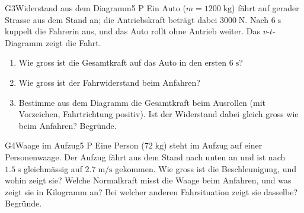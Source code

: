 \documentclass[11pt]{article}
\begin{document}
\begin{lpaufgabe}{G3}{Widerstand aus dem Diagramm}{5 P}
Ein Auto ($m = 1200\;\text{kg}$) fährt auf gerader Strasse aus dem Stand an; die Antriebskraft beträgt dabei $3000\;\text{N}$.
Nach $6\;\text{s}$ kuppelt die Fahrerin aus, und das Auto rollt ohne Antrieb weiter. Das $v$-$t$-Diagramm zeigt die Fahrt.\par\smallskip
\begin{center}\end{center}
\begin{enumerate}[label=\alph*),leftmargin=*,itemsep=2pt,topsep=2pt]
\item Wie gross ist die Gesamtkraft auf das Auto in den ersten $6\;\text{s}$?
\item Wie gross ist der Fahrwiderstand beim Anfahren?
\item Bestimme aus dem Diagramm die Gesamtkraft beim Ausrollen (mit Vorzeichen, Fahrtrichtung positiv). Ist der Widerstand dabei gleich gross wie beim Anfahren? Begründe.
\end{enumerate}
\end{lpaufgabe}


\begin{lpaufgabe}{G4}{Waage im Aufzug}{5 P}
Eine Person ($72\;\text{kg}$) steht im Aufzug auf einer Personenwaage. Der Aufzug fährt aus dem Stand nach unten an und ist nach $1.5\;\text{s}$ gleichmässig auf $2.7\;\text{m/s}$ gekommen.
Wie gross ist die Beschleunigung, und wohin zeigt sie? Welche Normalkraft misst die Waage beim Anfahren, und was zeigt sie in Kilogramm an?
Bei welcher anderen Fahrsituation zeigt sie dasselbe? Begründe.
\end{lpaufgabe}
\end{document}
